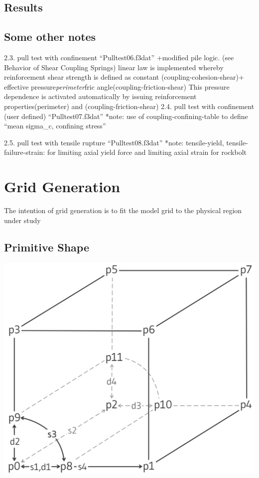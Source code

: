 \documentclass[a4paper, nobind]{templates/ociamthesis}
\begin{document}
\hypertarget{results-2}{%
\section{Results}\label{results-2}}

\hypertarget{some-other-notes}{%
\section{Some other notes}\label{some-other-notes}}

2.3. pull test with confinement ``Pulltest06.f3dat''
+modified pile logic.
(see Behavior of Shear Coupling Springs) linear law is implemented
whereby reinforcement shear strength is defined as constant
(coupling-cohesion-shear)+ effective pressure\emph{perimeter}fric angle(coupling-friction-shear)
This pressure dependence is activated automatically by issuing
reinforcement properties(perimeter) and (coupling-friction-shear)
2.4. pull test with confinement (user defined) ``Pulltest07.f3dat''
*note: use of coupling-confining-table to define ``mean sigma\_c, confining stress''

2.5. pull test with tensile rupture ``Pulltest08.f3dat''
*note: tensile-yield, tensile-failure-strain: for limiting axial yield force and limiting axial strain for rockbolt

\newpage

\hypertarget{grid-generation-1}{%
\chapter{Grid Generation}\label{grid-generation-1}}

The intention of grid generation is to fit the model grid to the physical region under study

\hypertarget{primitive-shape}{%
\section{Primitive Shape}\label{primitive-shape}}

\includegraphics[width=1\linewidth]{myfigureeeeee/radial-cylinder}
\end{document}
